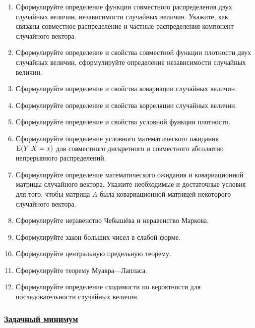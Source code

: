 \begin{enumerate}
\item Сформулируйте определение функции совместного распределения двух случайных величин, 
независимости случайных величин. 
Укажите, как связаны совместное распределение и частные распределения компонент случайного вектора.
\item Сформулируйте определение и свойства совместной функции плотности двух случайных величин, сформулируйте определение независимости случайных величин.
\item Сформулируйте определение и свойства ковариации случайных величин.
\item Сформулируйте определение и свойства корреляции случайных величин.
\item Сформулируйте определение и свойства условной функции плотности.
\item Сформулируйте определение условного математического ожидания $\operatorname{E}(Y|X=x)$ для совместного дискретного и совместного абсолютно непрерывного распределений.
\item Сформулируйте определение математического ожидания и ковариационной матрицы случайного
вектора. Укажите необходимые и достаточные условия для того, 
чтобы матрица $A$ была ковариационной матрицей некоторого случайного вектора.
\item Сформулируйте неравенство Чебышёва и неравенство Маркова.
\item Сформулируйте закон больших чисел в слабой форме.
\item Сформулируйте центральную предельную теорему.
\item Сформулируйте теорему Муавра—Лапласа.
\item Сформулируйте определение сходимости по вероятности для последовательности случайных величин.
\end{enumerate}

\newpage
\subsubsection*{\hyperref[sec:sol_minimum_kr_02]{Задачный минимум}}

